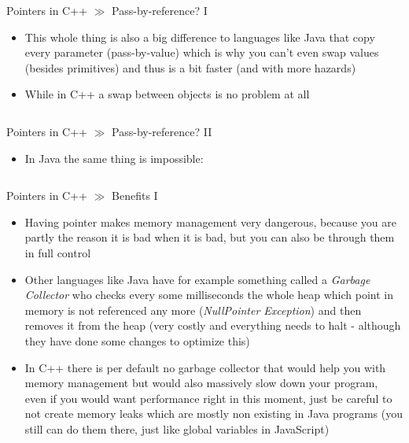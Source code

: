\documentclass[10pt]{beamer}
\begin{document}
\begin{frame}{Pointers in C++ $\gg$ Pass-by-reference? I}
\begin{itemize}
	\item This whole thing is also a big difference to languages like Java that copy every parameter (pass-by-value) which is why you can't even swap values (besides primitives) and thus is a bit faster (and with more hazards)
	\item While in C++ a swap between objects is no problem at all
	\inputminted[bgcolor=lightGreyCustom,fontsize=\scriptsize]{cpp}{./resources/good_swap.cpp}
\end{itemize}
\end{frame}

\begin{frame}{Pointers in C++ $\gg$ Pass-by-reference? II}
\begin{itemize}
	\item In Java the same thing is impossible:
	\inputminted[bgcolor=lightGreyCustom,fontsize=\scriptsize]{java}{./resources/BadSwap.java}
\end{itemize}
\end{frame}

\begin{frame}{Pointers in C++ $\gg$ Benefits I}
\begin{itemize}
	\item Having pointer makes memory management very dangerous, because you are partly the reason it is bad when it is bad, but you can also be through them in full control
	\item Other languages like Java have for example something called a \textit{Garbage Collector} who checks every some milliseconds the whole heap which point in memory is not referenced any more (\textit{NullPointer Exception}) and then removes it from the heap (very costly and everything needs to halt - although they have done some changes to optimize this)
	\item In C++ there is per default no garbage collector that would help you with memory management but would also massively slow down your program, even if you would want performance right in this moment, just be careful to not create memory leaks which are mostly non existing in Java programs (you still can do them there, just like global variables in JavaScript)
\end{itemize}
\end{frame}
\end{document}
